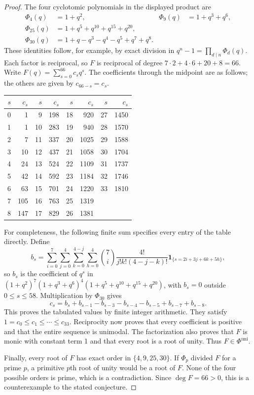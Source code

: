 \documentclass[11pt]{article}
\newcommand{\Phiuni}{\Phi^{\mathrm{uni}}}
\begin{document}
\begin{proof}
The four cyclotomic polynomials in the displayed product are
\begin{align*}
 \Phi_4(q)&=1+q^2,& \Phi_9(q)&=1+q^3+q^6,\\
 \Phi_{25}(q)&=1+q^5+q^{10}+q^{15}+q^{20},\\
 \Phi_{30}(q)&=1+q-q^3-q^4-q^5+q^7+q^8.
\end{align*}
These identities follow, for example, by exact division in
$q^n-1=\prod_{d\mid n}\Phi_d(q)$.
Each factor is reciprocal, so $F$ is reciprocal of degree
$7\cdot2+4\cdot6+20+8=66$. Write $F(q)=\sum_{s=0}^{66}c_sq^s$.
The coefficients through the midpoint are as follows; the others are
given by $c_{66-s}=c_s$.
\begin{center}
\begin{tabular}{rr@{\qquad}rr@{\qquad}rr@{\qquad}rr}
\toprule
$s$&$c_s$&$s$&$c_s$&$s$&$c_s$&$s$&$c_s$\\
\midrule
0&1&9&198&18&920&27&1450\\
1&1&10&283&19&940&28&1570\\
2&7&11&337&20&1025&29&1588\\
3&10&12&437&21&1058&30&1704\\
4&24&13&524&22&1109&31&1737\\
5&42&14&592&23&1184&32&1746\\
6&63&15&701&24&1220&33&1810\\
7&105&16&763&25&1319&&\\
8&147&17&829&26&1381&&\\
\bottomrule
\end{tabular}
\end{center}
\newpage
For completeness, the following finite sum specifies every entry of the
table directly. Define
\[
b_s=\sum_{i=0}^{7}\sum_{j=0}^{4}\sum_{k=0}^{4-j}\sum_{h=0}^{4}
 {7\choose i}\frac{4!}{j!k!(4-j-k)!}
 \mathbf{1}_{\{s=2i+3j+6k+5h\}},
\]
so $b_s$ is the coefficient of $q^s$ in
$(1+q^2)^7(1+q^3+q^6)^4(1+q^5+q^{10}+q^{15}+q^{20})$,
with $b_s=0$ outside $0\le s\le58$. Multiplication by $\Phi_{30}$ gives
\[
c_s=b_s+b_{s-1}-b_{s-3}-b_{s-4}-b_{s-5}+b_{s-7}+b_{s-8}.
\]
This proves the tabulated values by finite integer arithmetic. They satisfy
$1=c_0\le c_1\le\cdots\le c_{33}$. Reciprocity now proves that every
coefficient is positive and that the entire sequence is unimodal. The
factorization also proves that $F$ is monic with constant term 1 and that
every root is a root of unity. Thus $F\in\Phiuni$.

Finally, every root of $F$ has exact order in $\{4,9,25,30\}$.
If $\Phi_p$ divided $F$ for a prime $p$, a primitive $p$th root of unity
would be a root of $F$. None of the four possible orders is prime,
which is a contradiction. Since $\deg F=66>0$, this is a counterexample
to the stated conjecture.
\end{proof}
\end{document}
